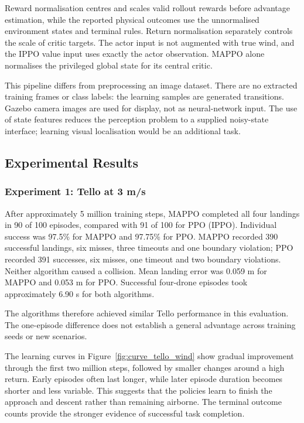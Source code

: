 Reward normalisation centres and scales valid rollout rewards before advantage estimation, while the reported physical outcomes use the unnormalised environment states and terminal rules. Return normalisation separately controls the scale of critic targets. The actor input is not augmented with true wind, and the IPPO value input uses exactly the actor observation. MAPPO alone normalises the privileged global state for its central critic.

This pipeline differs from preprocessing an image dataset. There are no extracted training frames or class labels: the learning samples are generated transitions. Gazebo camera images are used for display, not as neural-network input. The use of state features reduces the perception problem to a supplied noisy-state interface; learning visual localisation would be an additional task.

\hypertarget{experimental-results}{%
\subsection{Experimental Results}\label{experimental-results}}

\hypertarget{experiment-1-tello-at-3-ms}{%
\subsubsection{Experiment 1: Tello at 3 m/s}\label{experiment-1-tello-at-3-ms}}

After approximately 5 million training steps, MAPPO completed all four landings in 90 of 100 episodes, compared with 91 of 100 for PPO (IPPO). Individual success was 97.5\% for MAPPO and 97.75\% for PPO. MAPPO recorded 390 successful landings, six misses, three timeouts and one boundary violation; PPO recorded 391 successes, six misses, one timeout and two boundary violations. Neither algorithm caused a collision. Mean landing error was 0.059 m for MAPPO and 0.053 m for PPO. Successful four-drone episodes took approximately 6.90 s for both algorithms.

The algorithms therefore achieved similar Tello performance in this evaluation. The one-episode difference does not establish a general advantage across training seeds or new scenarios.

The learning curves in Figure~\ref{fig:curve_tello_wind} show gradual improvement through the first two million steps, followed by smaller changes around a high return. Early episodes often last longer, while later episode duration becomes shorter and less variable. This suggests that the policies learn to finish the approach and descent rather than remaining airborne. The terminal outcome counts provide the stronger evidence of successful task completion.

